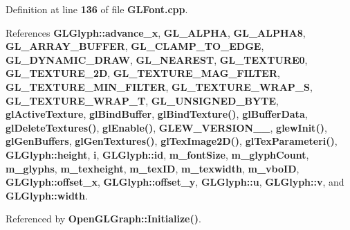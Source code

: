 Definition at line {\bf 136} of file {\bf G\+L\+Font.\+cpp}.



References {\bf G\+L\+Glyph\+::advance\+\_\+x}, {\bf G\+L\+\_\+\+A\+L\+P\+HA}, {\bf G\+L\+\_\+\+A\+L\+P\+H\+A8}, {\bf G\+L\+\_\+\+A\+R\+R\+A\+Y\+\_\+\+B\+U\+F\+F\+ER}, {\bf G\+L\+\_\+\+C\+L\+A\+M\+P\+\_\+\+T\+O\+\_\+\+E\+D\+GE}, {\bf G\+L\+\_\+\+D\+Y\+N\+A\+M\+I\+C\+\_\+\+D\+R\+AW}, {\bf G\+L\+\_\+\+N\+E\+A\+R\+E\+ST}, {\bf G\+L\+\_\+\+T\+E\+X\+T\+U\+R\+E0}, {\bf G\+L\+\_\+\+T\+E\+X\+T\+U\+R\+E\+\_\+2D}, {\bf G\+L\+\_\+\+T\+E\+X\+T\+U\+R\+E\+\_\+\+M\+A\+G\+\_\+\+F\+I\+L\+T\+ER}, {\bf G\+L\+\_\+\+T\+E\+X\+T\+U\+R\+E\+\_\+\+M\+I\+N\+\_\+\+F\+I\+L\+T\+ER}, {\bf G\+L\+\_\+\+T\+E\+X\+T\+U\+R\+E\+\_\+\+W\+R\+A\+P\+\_\+S}, {\bf G\+L\+\_\+\+T\+E\+X\+T\+U\+R\+E\+\_\+\+W\+R\+A\+P\+\_\+T}, {\bf G\+L\+\_\+\+U\+N\+S\+I\+G\+N\+E\+D\+\_\+\+B\+Y\+TE}, {\bf gl\+Active\+Texture}, {\bf gl\+Bind\+Buffer}, {\bf gl\+Bind\+Texture()}, {\bf gl\+Buffer\+Data}, {\bf gl\+Delete\+Textures()}, {\bf gl\+Enable()}, {\bf G\+L\+E\+W\+\_\+\+V\+E\+R\+S\+I\+O\+N\+\_\+\_}, {\bf glew\+Init()}, {\bf gl\+Gen\+Buffers}, {\bf gl\+Gen\+Textures()}, {\bf gl\+Tex\+Image2\+D()}, {\bf gl\+Tex\+Parameteri()}, {\bf G\+L\+Glyph\+::height}, {\bf i}, {\bf G\+L\+Glyph\+::id}, {\bf m\+\_\+font\+Size}, {\bf m\+\_\+glyph\+Count}, {\bf m\+\_\+glyphs}, {\bf m\+\_\+texheight}, {\bf m\+\_\+tex\+ID}, {\bf m\+\_\+texwidth}, {\bf m\+\_\+vbo\+ID}, {\bf G\+L\+Glyph\+::offset\+\_\+x}, {\bf G\+L\+Glyph\+::offset\+\_\+y}, {\bf G\+L\+Glyph\+::u}, {\bf G\+L\+Glyph\+::v}, and {\bf G\+L\+Glyph\+::width}.



Referenced by {\bf Open\+G\+L\+Graph\+::\+Initialize()}.



